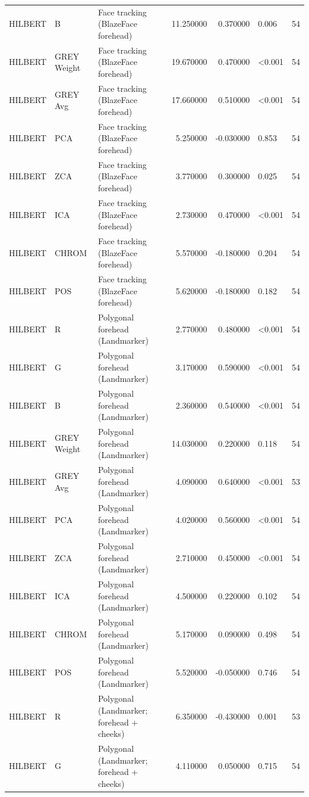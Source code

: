 \begin{table}[htbp]
\begin{tabular}{l l l r r l r}
HILBERT & B & Face tracking (BlazeFace forehead) & 11.250000 & 0.370000 & 0.006 & 54 \\
HILBERT & GREY Weight & Face tracking (BlazeFace forehead) & 19.670000 & 0.470000 & <0.001 & 54 \\
HILBERT & GREY Avg & Face tracking (BlazeFace forehead) & 17.660000 & 0.510000 & <0.001 & 54 \\
HILBERT & PCA & Face tracking (BlazeFace forehead) & 5.250000 & -0.030000 & 0.853 & 54 \\
HILBERT & ZCA & Face tracking (BlazeFace forehead) & 3.770000 & 0.300000 & 0.025 & 54 \\
HILBERT & ICA & Face tracking (BlazeFace forehead) & 2.730000 & 0.470000 & <0.001 & 54 \\
HILBERT & CHROM & Face tracking (BlazeFace forehead) & 5.570000 & -0.180000 & 0.204 & 54 \\
HILBERT & POS & Face tracking (BlazeFace forehead) & 5.620000 & -0.180000 & 0.182 & 54 \\
HILBERT & R & Polygonal forehead (Landmarker) & 2.770000 & 0.480000 & <0.001 & 54 \\
HILBERT & G & Polygonal forehead (Landmarker) & 3.170000 & 0.590000 & <0.001 & 54 \\
HILBERT & B & Polygonal forehead (Landmarker) & 2.360000 & 0.540000 & <0.001 & 54 \\
HILBERT & GREY Weight & Polygonal forehead (Landmarker) & 14.030000 & 0.220000 & 0.118 & 54 \\
HILBERT & GREY Avg & Polygonal forehead (Landmarker) & 4.090000 & 0.640000 & <0.001 & 53 \\
HILBERT & PCA & Polygonal forehead (Landmarker) & 4.020000 & 0.560000 & <0.001 & 54 \\
HILBERT & ZCA & Polygonal forehead (Landmarker) & 2.710000 & 0.450000 & <0.001 & 54 \\
HILBERT & ICA & Polygonal forehead (Landmarker) & 4.500000 & 0.220000 & 0.102 & 54 \\
HILBERT & CHROM & Polygonal forehead (Landmarker) & 5.170000 & 0.090000 & 0.498 & 54 \\
HILBERT & POS & Polygonal forehead (Landmarker) & 5.520000 & -0.050000 & 0.746 & 54 \\
HILBERT & R & Polygonal (Landmarker; forehead + cheeks) & 6.350000 & -0.430000 & 0.001 & 53 \\
HILBERT & G & Polygonal (Landmarker; forehead + cheeks) & 4.110000 & 0.050000 & 0.715 & 54 \\

\end{tabular}
\end{table}
